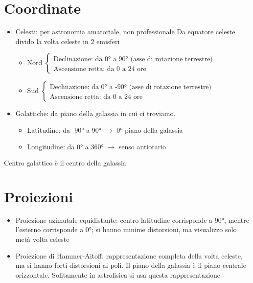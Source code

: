 \documentclass[a4paper,11pt]{report}
\theoremstyle{remark}
\theoremstyle{definition}
\begin{document}
\section*{Coordinate}
\begin{itemize}
    \item Celesti: per astronomia amatoriale, non professionale
    Da equatore celeste divido la volta celeste in 2 emisferi
    \begin{itemize}
        \item Nord 
        $\begin{cases}
            \text{Declinazione: da 0° a 90° (asse di rotazione terrestre)} \\
            \text{Ascensione retta: da 0 a 24 ore} 
        \end{cases}$
        \item Sud
        $\begin{cases}
            \text{Declinazione: da 0° a -90° (asse di rotazione terrestre)} \\
            \text{Ascensione retta: da 0 a 24 ore}
        \end{cases}$
    \end{itemize}
    \item Galattiche: da piano della galassia in cui ci troviamo. 
    \begin{itemize}
        \item Latitudine: da -90° a 90° $\rightarrow$ 0° piano della galassia
        \item Longitudine: da 0° a 360° $\rightarrow$ senso antiorario
    \end{itemize}
\end{itemize}
Centro galattico è il centro della galassia

\section*{Proiezioni}
\begin{itemize}
    \item Proiezione azimutale equidistante: centro latitudine corrisponde a 90°, mentre l'esterno corrisponde a 0°; si hanno minime distorsioni, ma visualizzo solo metà volta celeste
    \item Proiezione di Hammer-Aitoff: rappresentazione completa della volta celeste, ma si hanno forti distorsioni ai poli. Il piano della galassia è il piano centrale orizzontale. Solitamente in astrofisica si usa questa rappresentazione
\end{itemize}
\end{document}
